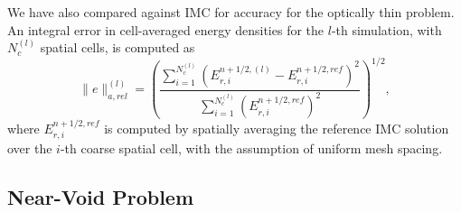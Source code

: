 \documentclass{anstrans}
\newcommand{\ds}[0]{\displaystyle}
\begin{document}
We have also compared against IMC for accuracy for the optically thin problem. An
integral error in cell-averaged energy densities for the
$l$-th simulation, with $N_c^{(l)}$ spatial cells, is computed as
\begin{equation}\label{eq:avg_err}
    \|e\|^{{(l)}}_{a,rel} = \left({\frac{\ds \sum\limits_{i=1}^{N^{(l)}_c}
    \left(E_{r,i}^{n+1/2,{(l)}} - E_{r,i}^{n+1/2,ref}
\right)^2}{\ds \sum\limits_{i=1}^{N^{(l)}_c}\left(E_{r,i}^{n+1/2,ref}\right)^2}}\right)^{1/2},
\end{equation}
where $E_{r,i}^{n+1/2,ref}$ is computed by spatially averaging the reference IMC solution over
the $i$-th coarse spatial cell, with the assumption of uniform mesh spacing.


\subsection{Near-Void Problem}
\end{document}
